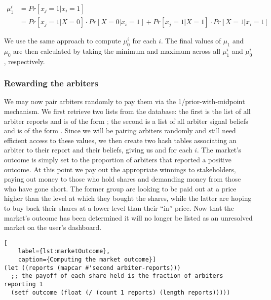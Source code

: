 \begin{equation}
	\label{eq:updateProbabilities}
	\begin{aligned}
		\mu_1^i & = Pr[x_j=1|x_i=1] \\
		& = Pr[x_j=1|X=0] \cdot Pr[X=0|x_i=1] + Pr[x_j=1|X=1] \cdot Pr[X=1|x_i=1]
	\end{aligned}
\end{equation}

We use the same approach to compute $\mu_0^i$ for each $i$. The final values of
$\mu_1$ and $\mu_0$ are then calculated by taking the minimum and maximum
across all $\mu_1^i$ and $\mu_0^i$, respectively.

\subsubsection{Rewarding the arbiters}

We may now pair arbiters randomly to pay them via the 1/prior-with-midpoint
mechanism. We first retrieve two lists from the database: the first is the list
of all arbiter reports and is of the form ; the second is a list of all arbiter signal beliefs and is of the
form .
Since we will be pairing arbiters randomly and still need efficient access to
these values, we then create two hash tables associating an arbiter to their
report and their beliefs, giving us  and
 for each $i$. The
market's outcome is simply set to the proportion of arbiters that reported a
positive outcome. At this point we pay out the appropriate winnings to
stakeholders, paying out money to those who hold shares and demanding money
from those who have gone short. The former group are looking to be paid out at
a price higher than the level at which they bought the shares, while the latter
are hoping to buy back their shares at a lower level than their ``in'' price.
Now that the market's outcome has been determined it will no longer be listed
as an unresolved market on the user's dashboard.

\begin{lstlisting}[
	label={lst:marketOutcome},
	caption={Computing the market outcome}]
(let ((reports (mapcar #'second arbiter-reports)))
  ;; the payoff of each share held is the fraction of arbiters reporting 1
  (setf outcome (float (/ (count 1 reports) (length reports)))))
\end{lstlisting}

